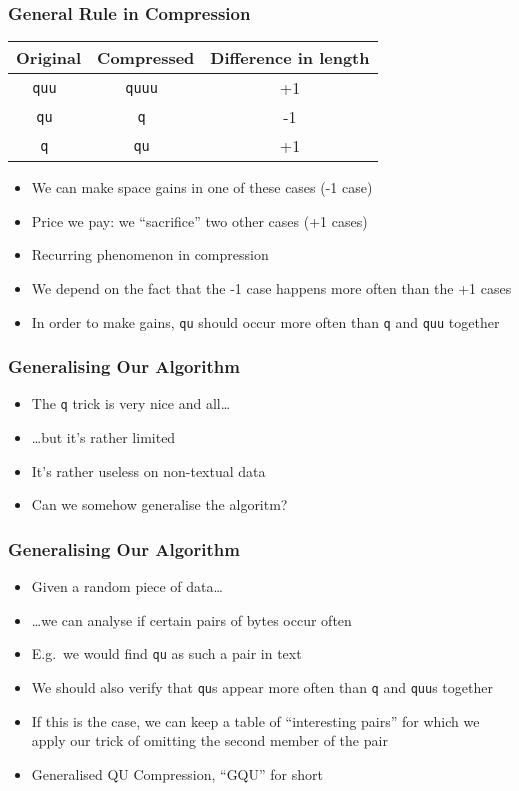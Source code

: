 \begin{frame}
  \frametitle{General Rule in Compression}
  \begin{center}
    \begin{tabular}{ccc}
      \bf Original & \bf Compressed & \bf Difference in length \\
      \toprule
      \tt quu & \tt quuu & +1 \\
      \tt qu & \tt q & -1 \\
      \tt q & \tt qu & +1 \\
    \end{tabular}
  \end{center}
  \begin{itemize}
    \item We can make space gains in one of these cases (-1 case)
    \item Price we pay: we ``sacrifice'' two other cases (+1 cases)
    \item Recurring phenomenon in compression
    \item We depend on the fact that the -1 case happens more often than the +1 cases
    \item In order to make gains, {\tt qu} should occur more often than {\tt q} and {\tt quu} together
  \end{itemize}
\end{frame}

\begin{frame}
  \frametitle{Generalising Our Algorithm}
  \begin{itemize}
    \item The {\tt q} trick is very nice and all\dots
    \item \dots but it's rather limited
    \item It's rather useless on non-textual data
    \item Can we somehow generalise the algoritm?
  \end{itemize}
\end{frame}

\begin{frame}
  \frametitle{Generalising Our Algorithm}
  \begin{itemize}
    \item Given a random piece of data\dots
    \item \dots we can analyse if certain pairs of bytes occur often
    \item E.g.\ we would find {\tt qu} as such a pair in text
    \item We should also verify that {\tt qu}s appear more often than {\tt q} and {\tt quu}s together
    \item If this is the case, we can keep a table of ``interesting pairs'' for which we apply our trick
          of omitting the second member of the pair
    \item Generalised QU Compression, ``GQU'' for short
  \end{itemize}
\end{frame}


